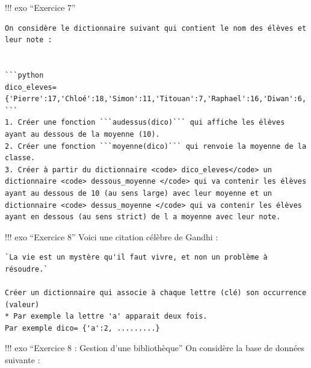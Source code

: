 \documentclass[
]{article}
\begin{document}
!!! exo ``Exercice 7''

\begin{verbatim}
On considère le dictionnaire suivant qui contient le nom des élèves et leur note : 


```python
dico_eleves={'Pierre':17,'Chloé':18,'Simon':11,'Titouan':7,'Raphael':16,'Diwan':6,'Ethann':8,'Clément':16,'Noa':17,'Solan':5,'Matheo':17,'Martin':10,'Valentin':11,'Zoé':7,'Antonin':18,'Sacha':9,'Emma':15,'Tidane':13,'Tristan':7,'Tifenn':20,'Soren':14,'Marjorie':15,'Maxime':7,'Liam':8,'Adrien':18,'Mathieu':16,'Lucas':8,'Louis':16,'Romane':19}
```
1. Créer une fonction ```audessus(dico)``` qui affiche les élèves ayant au dessous de la moyenne (10).
2. Créer une fonction ```moyenne(dico)``` qui renvoie la moyenne de la classe.
3. Créer à partir du dictionnaire <code> dico_eleves</code> un dictionnaire <code> dessous_moyenne </code> qui va contenir les élèves ayant au dessous de 10 (au sens large) avec leur moyenne et un dictionnaire <code> dessus_moyenne </code> qui va contenir les élèves ayant en dessous (au sens strict) de l a moyenne avec leur note.
\end{verbatim}

!!! exo ``Exercice 8'' Voici une citation célèbre de Gandhi :

\begin{verbatim}
`La vie est un mystère qu'il faut vivre, et non un problème à résoudre.`

Créer un dictionnaire qui associe à chaque lettre (clé) son occurrence (valeur)  
* Par exemple la lettre 'a' apparait deux fois.  
Par exemple dico= {'a':2, .........}
\end{verbatim}

!!! exo ``Exercice 8 : Gestion d'une bibliothèque'' On considère la base
de données suivante :
\end{document}
